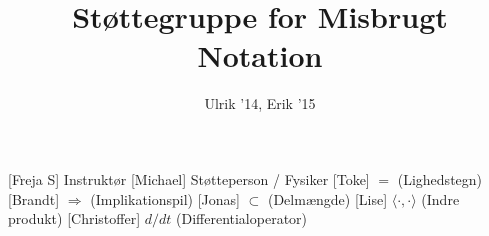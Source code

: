 \documentclass[a4paper,11pt]{article}
\title{Støttegruppe for Misbrugt Notation}
\author{Ulrik '14, Erik '15}
\begin{document}
\maketitle

\begin{roles}
[Freja S] Instruktør
[Michael] Støtteperson / Fysiker
[Toke] $=$ (Lighedstegn)
[Brandt] $\Rightarrow$ (Implikationspil)
[Jonas] $\subset$ (Delmængde)
[Lise] $\langle \cdot , \cdot \rangle$ (Indre produkt)
[Christoffer] $d / dt$ (Differentialoperator)
\end{roles}

\end{document}
